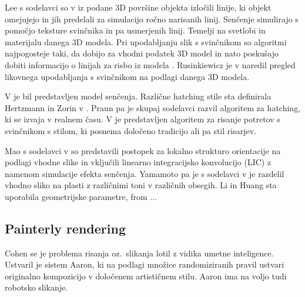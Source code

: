 Lee s sodelavci so v \cite{Lee:RealTime} iz podane 3D površine objekta izločili linije, ki objekt omejujejo in jih predelali za simulacijo ročno narisanih linij. Senčenje simulirajo s pomočjo teksture svinčnika in pa usmerjenih linij. Temelji na svetlobi in materijalu danega 3D modela. Pri upodabljanju slik s svinčnikom so algoritmi najpogosteje taki, da dobijo za vhodni podatek 3D model in nato poskušajo dobiti informacijo o linijah za risbo iz modela \cite{DeCarlo:Photographs, Judd:Ridges, Lee:Abstracted, Grabli:Programmable}. Rusinkiewicz je v \cite{Rusinkiewicz:Review} naredil pregled likovnega upodabljanja s svinčnikom na podlagi danega 3D modela.

V \cite{Lake:Stylized} je bil predstavljen model senčenja. Različne hatching stile sta definirala Hertzmann in Zorin v \cite{Hertzmann:Illustrating}. Praun pa je skupaj sodelavci \cite{Praun:ReaTime} razvil algoritem za hatching, ki se izvaja v realnem času. V \cite{Chen:Example} je predstavljen algoritem za risanje potretov s svinčnikom s stilom, ki posnema določeno tradicijo ali pa stil risarjev.

Mao s sodelavci v \cite{Mao:Automatic} so predstavili postopek za lokalno strukturo orientacije na podlagi vhodne slike in vključili linearno integracijsko konvolucijo (LIC) z namenom simulacije efekta senčenja. Yamamoto pa je s sodelavci v \cite{Yamamoto:Filter} je razdelil vhodno sliko na plasti z različnimi toni v različnih obsegih. Li in Huang \cite{Li:Feature} sta uporabila geometrijske parametre, from ... %
%
\subsection{Painterly rendering}
Cohen \cite{Cohen:Aaron, Morbey:Aaron} se je problema risanja oz.\ slikanja lotil z vidika umetne inteligence. Ustvaril je sistem Aaron, ki na podlagi množice randomiziranih pravil ustvari originalno kompozicijo v določenem artističnem stilu. Aaron ima na voljo tudi robotsko slikanje.
  
